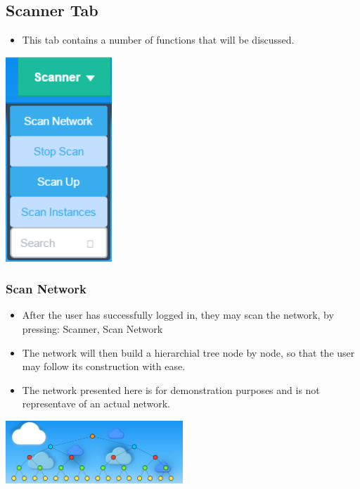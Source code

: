 \documentclass[hidelinks,a4paper,12pt]{article}
\begin{document}
		\subsection{Scanner Tab}
		\begin {itemize}
		\item This tab contains a number of functions that will be discussed.
		\end{itemize}
	
	\begin{center}
		\includegraphics[width=0.3\textwidth]{./images/AfterStop.png}
	\end{center}	

	\newpage
	
	\subsubsection{Scan Network}
		\begin {itemize}
			\item After the user has successfully logged in, they may scan the network, by pressing: Scanner, Scan Network
			\item The network will then build a hierarchial tree node by node, so that the user may follow its construction with ease.
			\item The network presented here is for demonstration purposes and is not representave of an actual network.
		\end{itemize}
	
		\begin{center}
		\includegraphics[width=0.5\textwidth]{./images/PostScanLaunch.png}
	\end{center}
		
\end{document}
